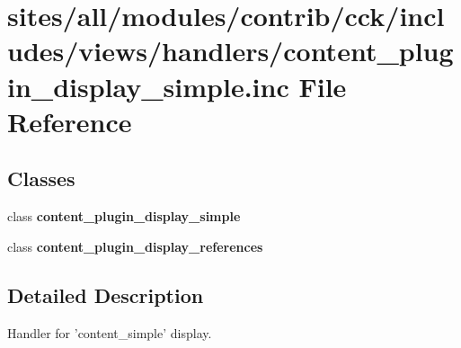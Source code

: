 \hypertarget{content__plugin__display__simple_8inc}{
\section{sites/all/modules/contrib/cck/includes/views/handlers/content\_\-plugin\_\-display\_\-simple.inc File Reference}
\label{content__plugin__display__simple_8inc}
}
\subsection*{Classes}
\begin{CompactItemize}
\item 
class \textbf{content\_\-plugin\_\-display\_\-simple}
\item 
class \textbf{content\_\-plugin\_\-display\_\-references}
\end{CompactItemize}


\subsection{Detailed Description}
Handler for 'content\_\-simple' display. 
